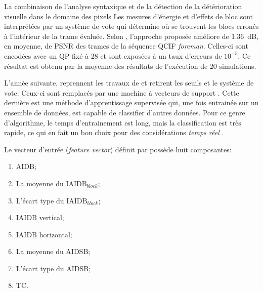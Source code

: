 \begin{section}{La combinaison de l'analyse syntaxique et de la
détection de la détérioration visuelle dans le domaine des pixels}
Les mesures d'énergie et d'effets de bloc sont interprétées par un système de
vote qui détermine où se trouvent les blocs erronés à l'intérieur de la trame
évaluée. Selon \citet{Superiori2007}, l'approche proposée améliore de 1.36~dB,
en moyenne, de PSNR des trames de la séquence QCIF \textit{foreman}. Celles-ci
sont encodées avec un QP fixé à 28 et sont exposées à un taux d'erreurs de
$10^{-5}$. Ce résultat est obtenu par la moyenne des résultats de l'exécution de
20 simulations.

L'année suivante, \citeauthor{Farrugia2008} reprennent les travaux de
\citet{Superiori2007} et retirent les seuils et le système de vote. Ceux-ci sont 
remplacés par une machine à vecteurs de support \citep{SVM1995}. Cette dernière
est une méthode d'apprentissage supervisée qui, une fois entrainée sur un
ensemble de données, est capable de classifier d'autres données. Pour ce genre
d'algorithme, le temps d'entrainement est long, mais la classification est très
rapide, ce qui en fait un bon choix pour des considérations \textit{temps réel}
\citep{Farrugia2008}.

Le vecteur d'entrée (\textit{feature vector}) définit par
\citeauthor{Farrugia2008} possède huit composantes: \begin{enumerate}[$\quad$1.]
  \item AIDB; \item La moyenne du $\text{IAIDB}_{block}$; \item L'écart type du
  $\text{IAIDB}_{block}$; \item IAIDB vertical; \item IAIDB horizontal; \item La
  moyenne du AIDSB; \item L'écart type du AIDSB; \item TC.
\end{enumerate}

\vspace{2em}


\end{section}
